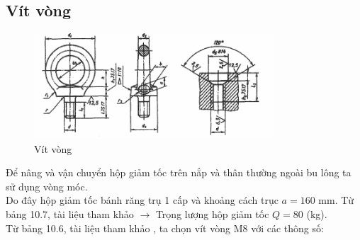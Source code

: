         \subsection{Vít vòng}
            \begin{figure}[H]
                \centering
                \includegraphics[width=0.8\textwidth]{pictures/ring_screw.png}
                \caption{Vít vòng}
                \label{ring_screw}
            \end{figure}
            \hspace*{0.6cm}Để nâng và vận chuyển hộp giảm tốc trên nắp và thân thường ngoài bu lông ta sử dụng vòng móc. \\
            \hspace*{0.6cm}Do đây hộp giảm tốc bánh răng trụ 1 cấp và khoảng cách trục $a = 160$ mm. Từ bảng 10.7, tài liệu tham khảo \cite{tkmctm} $\rightarrow$ Trọng lượng hộp giảm tốc $Q = 80$ (kg). \\
            \hspace*{0.6cm}Từ bảng 10.6, tài liệu tham khảo \cite{tkmctm}, ta chọn vít vòng M8 với các thông số: 
